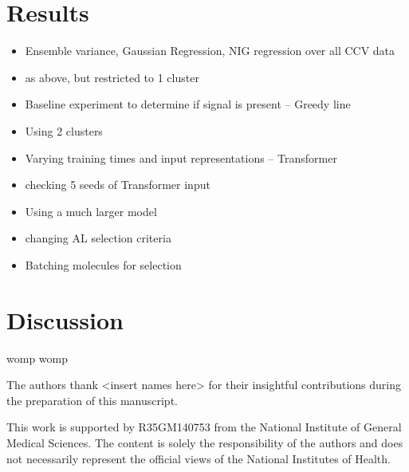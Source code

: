 \documentclass[journal=jmcmar,manuscript=article]{achemso}
\begin{document}
\section{Results}

\begin{itemize}
    \item Ensemble variance, Gaussian Regression, NIG regression over all CCV data
    \item as above, but restricted to 1 cluster
    \item Baseline experiment to determine if signal is present -- Greedy line
    \item Using 2 clusters
    \item Varying training times and input representations -- Transformer
    \item checking 5 seeds of Transformer input
    \item Using a much larger model
    \item changing AL selection criteria 
    \item Batching molecules for selection
\end{itemize}

\section{Discussion}

womp womp

\begin{acknowledgement}


The authors thank <insert names here> for their insightful contributions during the preparation of this manuscript.

This work is supported by R35GM140753 from the National Institute of General Medical Sciences. The content is solely the responsibility of the authors and does not necessarily represent the official views of the National Institutes of Health.

\end{acknowledgement}
\end{document}
